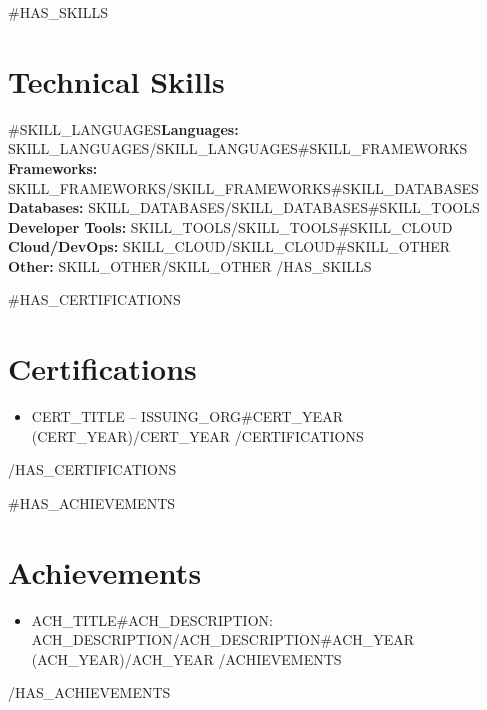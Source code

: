 \documentclass[10pt,letterpaper]{article}
\begin{document}
{{#HAS_SKILLS}}
\section*{Technical Skills}
{{#SKILL_LANGUAGES}}\textbf{Languages:} {{SKILL_LANGUAGES}}{{/SKILL_LANGUAGES}}{{#SKILL_FRAMEWORKS}}
\\\textbf{Frameworks:} {{SKILL_FRAMEWORKS}}{{/SKILL_FRAMEWORKS}}{{#SKILL_DATABASES}}
\\\textbf{Databases:} {{SKILL_DATABASES}}{{/SKILL_DATABASES}}{{#SKILL_TOOLS}}
\\\textbf{Developer Tools:} {{SKILL_TOOLS}}{{/SKILL_TOOLS}}{{#SKILL_CLOUD}}
\\\textbf{Cloud/DevOps:} {{SKILL_CLOUD}}{{/SKILL_CLOUD}}{{#SKILL_OTHER}}
\\\textbf{Other:} {{SKILL_OTHER}}{{/SKILL_OTHER}}
{{/HAS_SKILLS}}

{{#HAS_CERTIFICATIONS}}
\section*{Certifications}
\begin{itemize}
{{#CERTIFICATIONS}}
\item {{CERT_TITLE}} -- {{ISSUING_ORG}}{{#CERT_YEAR}} ({{CERT_YEAR}}){{/CERT_YEAR}}
{{/CERTIFICATIONS}}
\end{itemize}
{{/HAS_CERTIFICATIONS}}

{{#HAS_ACHIEVEMENTS}}
\section*{Achievements}
\begin{itemize}
{{#ACHIEVEMENTS}}
\item {{ACH_TITLE}}{{#ACH_DESCRIPTION}}: {{ACH_DESCRIPTION}}{{/ACH_DESCRIPTION}}{{#ACH_YEAR}} ({{ACH_YEAR}}){{/ACH_YEAR}}
{{/ACHIEVEMENTS}}
\end{itemize}
{{/HAS_ACHIEVEMENTS}}
\end{document}
